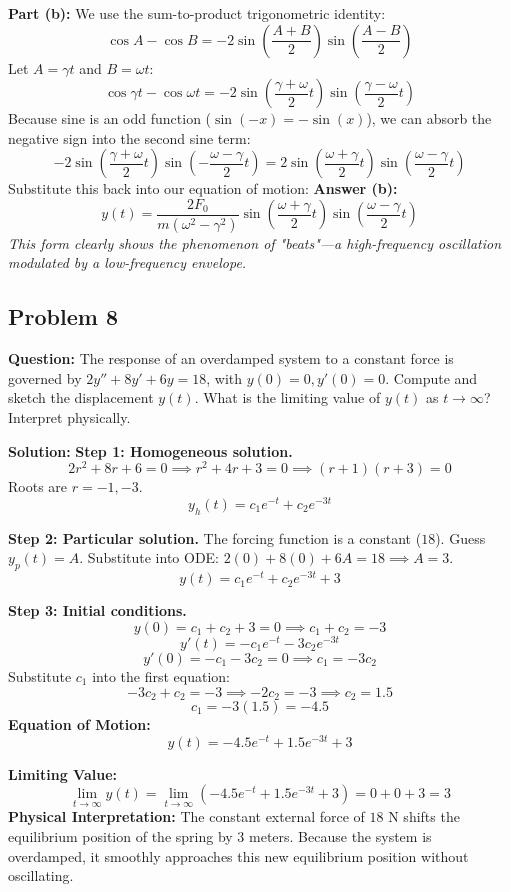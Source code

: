 \documentclass[11pt]{article}
\begin{document}
\textbf{Part (b):}
We use the sum-to-product trigonometric identity:
\[ \cos A - \cos B = -2 \sin\left(\frac{A+B}{2}\right) \sin\left(\frac{A-B}{2}\right) \]
Let $A = \gamma t$ and $B = \omega t$:
\[ \cos \gamma t - \cos \omega t = -2 \sin\left(\frac{\gamma + \omega}{2}t\right) \sin\left(\frac{\gamma - \omega}{2}t\right) \]
Because sine is an odd function ($\sin(-x) = -\sin(x)$), we can absorb the negative sign into the second sine term:
\[ -2 \sin\left(\frac{\gamma + \omega}{2}t\right) \sin\left(-\frac{\omega - \gamma}{2}t\right) = 2 \sin\left(\frac{\omega + \gamma}{2}t\right) \sin\left(\frac{\omega - \gamma}{2}t\right) \]
Substitute this back into our equation of motion:
\textbf{Answer (b):}
\[ y(t) = \frac{2F_0}{m(\omega^2 - \gamma^2)} \sin\left(\frac{\omega + \gamma}{2}t\right) \sin\left(\frac{\omega - \gamma}{2}t\right) \]
\textit{This form clearly shows the phenomenon of "beats"—a high-frequency oscillation modulated by a low-frequency envelope.}

\subsection{Problem 8}
\textbf{Question:} The response of an overdamped system to a constant force is governed by $2y'' + 8y' + 6y = 18$, with $y(0)=0, y'(0)=0$. Compute and sketch the displacement $y(t)$. What is the limiting value of $y(t)$ as $t \to \infty$? Interpret physically.

\textbf{Solution:}
\textbf{Step 1: Homogeneous solution.}
\[ 2r^2 + 8r + 6 = 0 \implies r^2 + 4r + 3 = 0 \implies (r+1)(r+3) = 0 \]
Roots are $r = -1, -3$.
\[ y_h(t) = c_1 e^{-t} + c_2 e^{-3t} \]

\textbf{Step 2: Particular solution.}
The forcing function is a constant ($18$). Guess $y_p(t) = A$.
Substitute into ODE: $2(0) + 8(0) + 6A = 18 \implies A = 3$.
\[ y(t) = c_1 e^{-t} + c_2 e^{-3t} + 3 \]

\textbf{Step 3: Initial conditions.}
\[ y(0) = c_1 + c_2 + 3 = 0 \implies c_1 + c_2 = -3 \]
\[ y'(t) = -c_1 e^{-t} - 3c_2 e^{-3t} \]
\[ y'(0) = -c_1 - 3c_2 = 0 \implies c_1 = -3c_2 \]
Substitute $c_1$ into the first equation:
\[ -3c_2 + c_2 = -3 \implies -2c_2 = -3 \implies c_2 = 1.5 \]
\[ c_1 = -3(1.5) = -4.5 \]
\textbf{Equation of Motion:}
\[ y(t) = -4.5 e^{-t} + 1.5 e^{-3t} + 3 \]

\textbf{Limiting Value:}
\[ \lim_{t \to \infty} y(t) = \lim_{t \to \infty} (-4.5 e^{-t} + 1.5 e^{-3t} + 3) = 0 + 0 + 3 = 3 \]
\textbf{Physical Interpretation:} The constant external force of $18$ N shifts the equilibrium position of the spring by $3$ meters. Because the system is overdamped, it smoothly approaches this new equilibrium position without oscillating.
\end{document}
